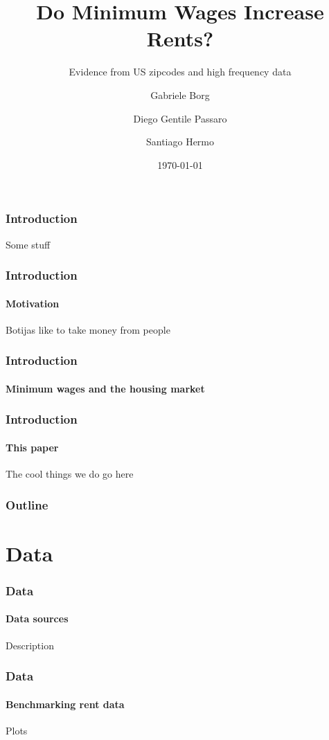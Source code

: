 \documentclass[aspectratio=169]{beamer}
\title{Do Minimum Wages Increase Rents?}
\subtitle{Evidence from US zipcodes and high frequency data}
\date{\today}
\author{Gabriele Borg \and Diego Gentile Passaro \and Santiago Hermo}
\institute{Brown University}
\begin{document}
\maketitle

	\begin{frame}
		\frametitle{Introduction}
	
		Some stuff
	
	\end{frame}

	\begin{frame}
		
		\frametitle{Introduction}
		\framesubtitle{Motivation}
	
		Botijas like to take money from people
	
	\end{frame}
	
	\begin{frame}
		\frametitle{Introduction}
		\framesubtitle{Minimum wages and the housing market}
		
		
		
	\end{frame}
	
	\begin{frame}
		\frametitle{Introduction}
		\framesubtitle{This paper}
		
		The cool things we do go here
		
	\end{frame}
	
	

\begin{frame}
	\frametitle{Outline}
	\tableofcontents
\end{frame}



\section[Data]{Data}

	\begin{frame}
		\frametitle{Data}
		\framesubtitle{Data sources}
		
		Description
		
	\end{frame}
	
	\begin{frame}
		\frametitle{Data}
		\framesubtitle{Benchmarking rent data}
		
		Plots
		
	\end{frame}
	
\end{document}
